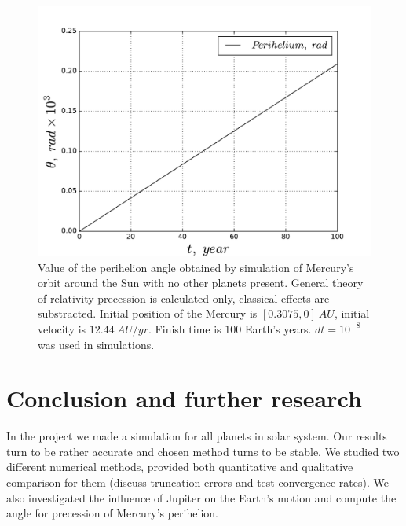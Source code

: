 \documentclass[10pt]{article}
\begin{document}
\begin{figure}[ht]
  \begin{center}
    \includegraphics[scale=0.5]{mercury}
    \caption {Value of the perihelion angle obtained by simulation of Mercury’s orbit around the Sun with no other planets present. General theory of relativity precession is calculated only, classical effects are substracted. Initial position of the Mercury is $[0.3075,0]\ AU$, initial velocity is $12.44\ AU/yr$. Finish time is $100$ Earth's years. $dt=10^{-8}$ was used in simulations. }
    \label{fig:perihelion}
  \end{center}
\end{figure}
\clearpage

\newpage
\section{Conclusion and further research}\label{conc}
In the project we made a simulation for all planets in solar system. Our results turn to be rather accurate and chosen method turns to be stable. We studied two different numerical methods, provided both quantitative and qualitative comparison for them (discuss truncation errors and test convergence rates). We also investigated the influence of Jupiter on the Earth's motion and compute the angle for precession of Mercury's perihelion.
\end{document}
